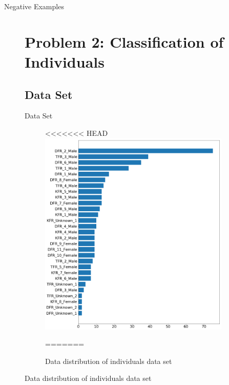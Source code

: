 \documentclass[10pt]{beamer}
\begin{document}
\begin{frame}{Negative Examples}
\begin{figure}
\section{Problem 2: Classification of Individuals}
\subsection{Data Set}
\begin{frame}{Data Set}
	\begin{minipage}[c]{0.48\linewidth}
		\centering
		\begin{figure}
<<<<<<< HEAD
			\includegraphics[width=\linewidth,height=.8\textheight,keepaspectratio]{images/Data_dist_leo_v2.png}
			\caption{Data distribution of individuals data set}
=======

\end{figure}
\end{minipage}
\end{frame}
\end{figure}
\end{frame}
\end{document}
